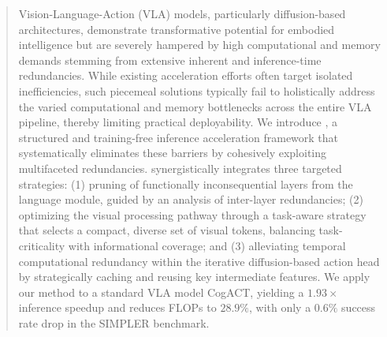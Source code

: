 \begin{abstract}
Vision-Language-Action (VLA) models, particularly diffusion-based architectures, demonstrate transformative potential for embodied intelligence but are severely hampered by high computational and memory demands stemming from extensive inherent and inference-time redundancies. While existing acceleration efforts often target isolated inefficiencies, such piecemeal solutions typically fail to holistically address the varied computational and memory bottlenecks across the entire VLA pipeline, thereby limiting practical deployability.  We introduce \textbf{\mymethod{}}, a structured and training-free inference acceleration framework that systematically eliminates these barriers by cohesively exploiting multifaceted redundancies. \mymethod{} synergistically integrates three targeted strategies: (1) pruning of functionally inconsequential layers from the language module, guided by an analysis of inter-layer redundancies; (2) optimizing the visual processing pathway through a task-aware strategy that selects a compact, diverse set of visual tokens, balancing task-criticality with informational coverage; and (3) alleviating temporal computational redundancy within the iterative diffusion-based action head by strategically caching and reusing key intermediate features.
We apply our method to a standard VLA model CogACT, yielding a $1.93\times$ inference speedup and reduces FLOPs to $28.9\%$, with only a $0.6\%$ success rate drop in the SIMPLER benchmark. 

\end{abstract}

